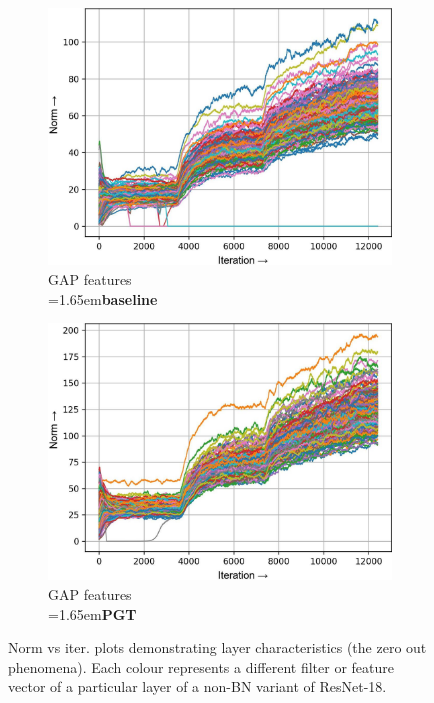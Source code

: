 \documentclass[runningheads]{llncs}
\newcommand{\forceindentb}{\parindent=1.65em\indent\parindent=0pt\relax}
\begin{document}
\begin{figure}[h]
\begin{subfigure}[t]{0.34\textwidth}
\includegraphics[width=\textwidth]{trimmed/baseline-f-layer-22-1}
\caption{GAP features\\ \forceindentb\textbf{baseline}}
\end{subfigure}
\begin{subfigure}[t]{0.34\textwidth}
\includegraphics[width=\textwidth]{trimmed/pgt-f-layer-22-1}
\caption{GAP features\\ \forceindentb\textbf{PGT}}
\end{subfigure}
\caption{ Norm vs iter. plots demonstrating layer characteristics (the zero out
phenomena). Each colour represents a different filter or feature vector of a particular
layer of a non-BN variant of ResNet-18. }
\end{figure}
\end{document}
